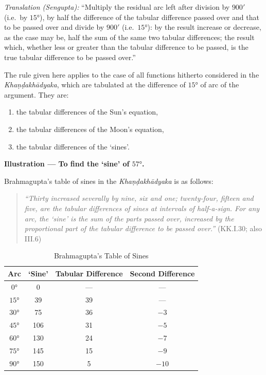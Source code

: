 \documentclass[11pt,a4paper]{article}
\begin{document}
\textit{Translation (Sengupta):} ``Multiply the residual arc left after division by $900'$ (i.e.\ by $15°$), by half the difference of the tabular difference passed over and that to be passed over and divide by $900'$ (i.e.\ $15°$): by the result increase or decrease, as the case may be, half the sum of the same two tabular differences; the result which, whether less or greater than the tabular difference to be passed, is the true tabular difference to be passed over.''

The rule given here applies to the case of all functions hitherto considered in the \textit{Khaṇḍakhādyaka}, which are tabulated at the difference of $15°$ of arc of the argument. They are:
\begin{enumerate}[label=(\roman*)]
\item the tabular differences of the Sun's equation,
\item the tabular differences of the Moon's equation,
\item the tabular differences of the `sines'.
\end{enumerate}

\textbf{Illustration --- To find the `sine' of $57°$.}

Brahmagupta's table of sines in the \textit{Khaṇḍakhādyaka} is as follows:

\begin{quote}
\textit{``Thirty increased severally by nine, six and one; twenty-four, fifteen and five, are the tabular differences of sines at intervals of half-a-sign. For any arc, the `sine' is the sum of the parts passed over, increased by the proportional part of the tabular difference to be passed over.''} (KK.I.30; also III.6)
\end{quote}

\begin{table}[h]
\centering
\caption{Brahmagupta's Table of Sines}
\begin{tabular}{@{}cccc@{}}
\toprule
\textbf{Arc} & \textbf{`Sine'} & \textbf{Tabular Difference} & \textbf{Second Difference} \\
\midrule
$0°$ & 0 & --- & --- \\
$15°$ & 39 & 39 & --- \\
$30°$ & 75 & 36 & $-3$ \\
$45°$ & 106 & 31 & $-5$ \\
$60°$ & 130 & 24 & $-7$ \\
$75°$ & 145 & 15 & $-9$ \\
$90°$ & 150 & 5 & $-10$ \\
\bottomrule
\end{tabular}
\end{table}
\end{document}
